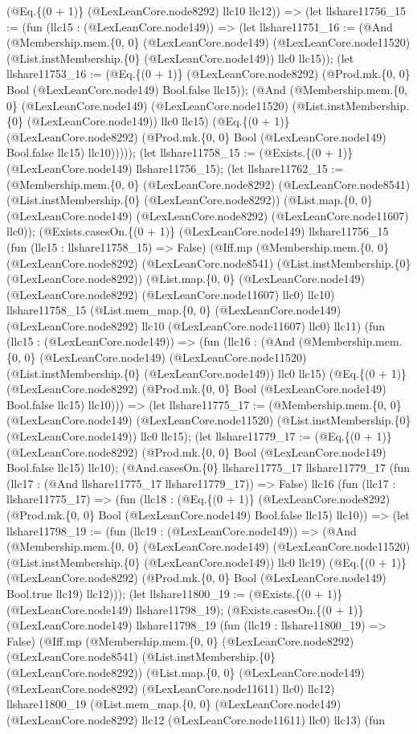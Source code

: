 \documentclass[11pt]{article}
\begin{document}
(@Eq.\{(0 + 1)\} (@LexLeanCore.node8292) llc10 llc12)) => (let llshare11756\_15 := (fun (llc15 : (@LexLeanCore.node149)) => (let llshare11751\_16 := (@And (@Membership.mem.\{0, 0\} (@LexLeanCore.node149) (@LexLeanCore.node11520) (@List.instMembership.\{0\} (@LexLeanCore.node149)) llc0 llc15)); (let llshare11753\_16 := (@Eq.\{(0 + 1)\} (@LexLeanCore.node8292) (@Prod.mk.\{0, 0\} Bool (@LexLeanCore.node149) Bool.false llc15)); (@And (@Membership.mem.\{0, 0\} (@LexLeanCore.node149) (@LexLeanCore.node11520) (@List.instMembership.\{0\} (@LexLeanCore.node149)) llc0 llc15) (@Eq.\{(0 + 1)\} (@LexLeanCore.node8292) (@Prod.mk.\{0, 0\} Bool (@LexLeanCore.node149) Bool.false llc15) llc10))))); (let llshare11758\_15 := (@Exists.\{(0 + 1)\} (@LexLeanCore.node149) llshare11756\_15); (let llshare11762\_15 := (@Membership.mem.\{0, 0\} (@LexLeanCore.node8292) (@LexLeanCore.node8541) (@List.instMembership.\{0\} (@LexLeanCore.node8292)) (@List.map.\{0, 0\} (@LexLeanCore.node149) (@LexLeanCore.node8292) (@LexLeanCore.node11607) llc0)); (@Exists.casesOn.\{(0 + 1)\} (@LexLeanCore.node149) llshare11756\_15 (fun (llc15 : llshare11758\_15) => False) (@Iff.mp (@Membership.mem.\{0, 0\} (@LexLeanCore.node8292) (@LexLeanCore.node8541) (@List.instMembership.\{0\} (@LexLeanCore.node8292)) (@List.map.\{0, 0\} (@LexLeanCore.node149) (@LexLeanCore.node8292) (@LexLeanCore.node11607) llc0) llc10) llshare11758\_15 (@List.mem\_map.\{0, 0\} (@LexLeanCore.node149) (@LexLeanCore.node8292) llc10 (@LexLeanCore.node11607) llc0) llc11) (fun (llc15 : (@LexLeanCore.node149)) => (fun (llc16 : (@And (@Membership.mem.\{0, 0\} (@LexLeanCore.node149) (@LexLeanCore.node11520) (@List.instMembership.\{0\} (@LexLeanCore.node149)) llc0 llc15) (@Eq.\{(0 + 1)\} (@LexLeanCore.node8292) (@Prod.mk.\{0, 0\} Bool (@LexLeanCore.node149) Bool.false llc15) llc10))) => (let llshare11775\_17 := (@Membership.mem.\{0, 0\} (@LexLeanCore.node149) (@LexLeanCore.node11520) (@List.instMembership.\{0\} (@LexLeanCore.node149)) llc0 llc15); (let llshare11779\_17 := (@Eq.\{(0 + 1)\} (@LexLeanCore.node8292) (@Prod.mk.\{0, 0\} Bool (@LexLeanCore.node149) Bool.false llc15) llc10); (@And.casesOn.\{0\} llshare11775\_17 llshare11779\_17 (fun (llc17 : (@And llshare11775\_17 llshare11779\_17)) => False) llc16 (fun (llc17 : llshare11775\_17) => (fun (llc18 : (@Eq.\{(0 + 1)\} (@LexLeanCore.node8292) (@Prod.mk.\{0, 0\} Bool (@LexLeanCore.node149) Bool.false llc15) llc10)) => (let llshare11798\_19 := (fun (llc19 : (@LexLeanCore.node149)) => (@And (@Membership.mem.\{0, 0\} (@LexLeanCore.node149) (@LexLeanCore.node11520) (@List.instMembership.\{0\} (@LexLeanCore.node149)) llc0 llc19) (@Eq.\{(0 + 1)\} (@LexLeanCore.node8292) (@Prod.mk.\{0, 0\} Bool (@LexLeanCore.node149) Bool.true llc19) llc12))); (let llshare11800\_19 := (@Exists.\{(0 + 1)\} (@LexLeanCore.node149) llshare11798\_19); (@Exists.casesOn.\{(0 + 1)\} (@LexLeanCore.node149) llshare11798\_19 (fun (llc19 : llshare11800\_19) => False) (@Iff.mp (@Membership.mem.\{0, 0\} (@LexLeanCore.node8292) (@LexLeanCore.node8541) (@List.instMembership.\{0\} (@LexLeanCore.node8292)) (@List.map.\{0, 0\} (@LexLeanCore.node149) (@LexLeanCore.node8292) (@LexLeanCore.node11611) llc0) llc12) llshare11800\_19 (@List.mem\_map.\{0, 0\} (@LexLeanCore.node149) (@LexLeanCore.node8292) llc12 (@LexLeanCore.node11611) llc0) llc13) (fun 
\end{document}
